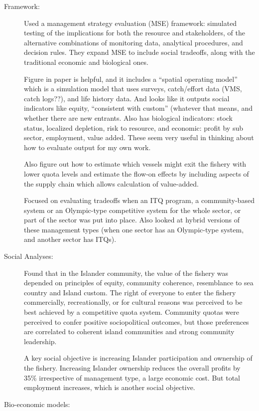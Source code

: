 \documentclass[a4paper,10pt]{article}
\begin{document}
\begin{description}
\item[Framework:] Used a management strategy evaluation (MSE) framework: simulated testing of the implications for both the resource and stakeholders, of the alternative combinations of monitoring data, analytical procedures, and decision rules. They expand MSE to include social tradeoffs, along with the traditional economic and biological ones. 

Figure in paper is helpful, and it includes a ``spatial operating model'' which is a simulation model that uses surveys, catch/effort data (VMS, catch logs??), and life history data. And looks like it outputs social indicators like equity, ``consistent with custom'' (whatever that means, and whether there are new entrants. Also has biological indicators: stock status, localized depletion, risk to resource, and economic: profit by sub sector, employment, value added. These seem very useful in thinking about how to evaluate output for my own work. 

Also figure out how to estimate which vessels might exit the fishery with lower quota levels and estimate the flow-on effects by including aspects of the supply chain which allows calculation of value-added. 


Focused on evaluating tradeoffs when an ITQ program, a community-based system or an Olympic-type competitive system for the whole sector, or part of the sector was put into place. Also looked at hybrid versions of these management types (when one sector has an Olympic-type system, and another sector has ITQs). 

\item[Social Analyses:] Found that in the Islander community, the value of the fishery was depended on principles of equity, community coherence, resemblance to sea country and Island custom. The right of everyone to enter the fishery commercially, recreationally, or for cultural reasons was perceived to be best achieved by a competitive quota system. Community quotas were perceived to confer positive sociopolitical outcomes, but those preferences are correlated to coherent island communities and strong community leadership. 


A key social objective is increasing Islander participation and ownership of the fishery. Increasing Islander ownership reduces the overall profits by 35\% irrespective of management type, a large economic cost. But total employment increases, which is another social objective. 


\item[Bio-economic models:]
\end{description}
\end{document}
